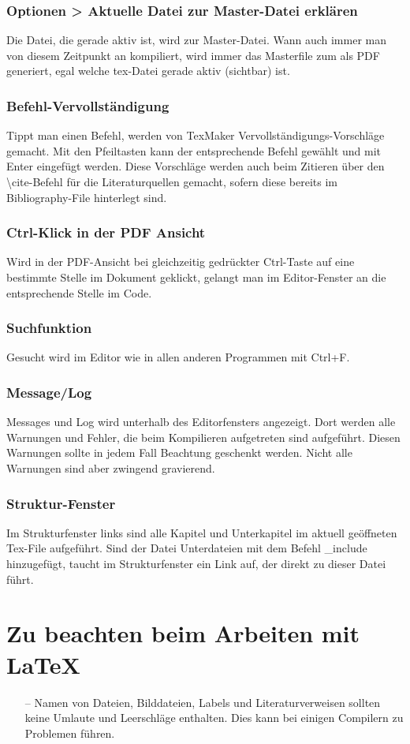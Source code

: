 \subsubsection{Optionen > Aktuelle Datei zur Master-Datei erklären}%
%
Die Datei, die gerade aktiv ist, wird zur Master-Datei. Wann auch immer man von diesem Zeitpunkt an kompiliert, wird immer das Masterfile zum als PDF generiert, egal welche tex-Datei gerade aktiv (sichtbar) ist.%
%
\subsubsection{Befehl-Vervollständigung}%
%
Tippt man einen Befehl, werden von TexMaker Vervollständigungs-Vorschläge gemacht. Mit den Pfeiltasten kann der entsprechende Befehl gewählt und mit Enter eingefügt werden. Diese Vorschläge werden auch beim Zitieren über den \textbackslash{}cite-Befehl für die Literaturquellen gemacht, sofern diese bereits im Bibliography-File hinterlegt sind.%
%
\subsubsection{Ctrl-Klick in der PDF Ansicht}%
%
Wird in der PDF-Ansicht bei gleichzeitig gedrückter Ctrl-Taste auf eine bestimmte Stelle im Dokument geklickt, gelangt man im Editor-Fenster an die entsprechende Stelle im Code.%
%
\subsubsection{Suchfunktion}%
%
Gesucht wird im Editor wie in allen anderen Programmen mit Ctrl+F.%
%
%
\subsubsection{Message/Log}%
%
Messages und Log wird unterhalb des Editorfensters angezeigt. Dort werden alle Warnungen und Fehler, die beim Kompilieren aufgetreten sind aufgeführt. Diesen Warnungen sollte in jedem Fall Beachtung geschenkt werden. Nicht alle Warnungen sind aber zwingend gravierend.%
%
\subsubsection{Struktur-Fenster}%
%
Im Strukturfenster links sind alle Kapitel und Unterkapitel im aktuell geöffneten Tex-File aufgeführt. Sind der Datei Unterdateien mit dem Befehl \_{}include hinzugefügt, taucht im Strukturfenster ein Link auf, der direkt zu dieser Datei führt.%
%
\section{Zu beachten beim Arbeiten mit \LaTeX}%
%
\begin{itemize}%
\item[--] Namen von Dateien, Bilddateien, Labels und Literaturverweisen sollten keine Umlaute und Leerschläge enthalten. Dies kann bei einigen Compilern zu Problemen führen.%
\end{itemize}%